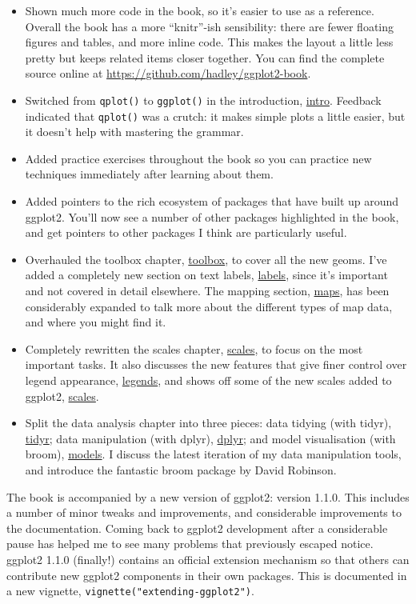 \begin{itemize}
\item
  Shown much more code in the book, so it's easier to use as a
  reference. Overall the book has a more ``knitr''-ish sensibility:
  there are fewer floating figures and tables, and more inline code.
  This makes the layout a little less pretty but keeps related items
  closer together. You can find the complete source online at
  \url{https://github.com/hadley/ggplot2-book}.
\item
  Switched from \texttt{qplot()} to \texttt{ggplot()} in the
  introduction, \hyperref[cha:getting-started]{intro}. Feedback
  indicated that \texttt{qplot()} was a crutch: it makes simple plots a
  little easier, but it doesn't help with mastering the grammar.
\item
  Added practice exercises throughout the book so you can practice new
  techniques immediately after learning about them.
\item
  Added pointers to the rich ecosystem of packages that have built up
  around ggplot2. You'll now see a number of other packages highlighted
  in the book, and get pointers to other packages I think are
  particularly useful.
\item
  Overhauled the toolbox chapter, \hyperref[cha:toolbox]{toolbox}, to
  cover all the new geoms. I've added a completely new section on text
  labels, \hyperref[sec:labelling]{labels}, since it's important and not
  covered in detail elsewhere. The mapping section,
  \hyperref[sec:maps]{maps}, has been considerably expanded to talk more
  about the different types of map data, and where you might find it.
\item
  Completely rewritten the scales chapter,
  \hyperref[cha:scales]{scales}, to focus on the most important tasks.
  It also discusses the new features that give finer control over legend
  appearance, \hyperref[sec:legends]{legends}, and shows off some of the
  new scales added to ggplot2, \hyperref[sec:scale-details]{scales}.
\item
  Split the data analysis chapter into three pieces: data tidying (with
  tidyr), \hyperref[cha:data]{tidyr}; data manipulation (with dplyr),
  \hyperref[cha:dplyr]{dplyr}; and model visualisation (with broom),
  \hyperref[cha:modelling]{models}. I discuss the latest iteration of my
  data manipulation tools, and introduce the fantastic broom package by
  David Robinson.
\end{itemize}

The book is accompanied by a new version of ggplot2: version 1.1.0. This
includes a number of minor tweaks and improvements, and considerable
improvements to the documentation. Coming back to ggplot2 development
after a considerable pause has helped me to see many problems that
previously escaped notice. ggplot2 1.1.0 (finally!) contains an official
extension mechanism so that others can contribute new ggplot2 components
in their own packages. This is documented in a new vignette,
\texttt{vignette("extending-ggplot2")}.

